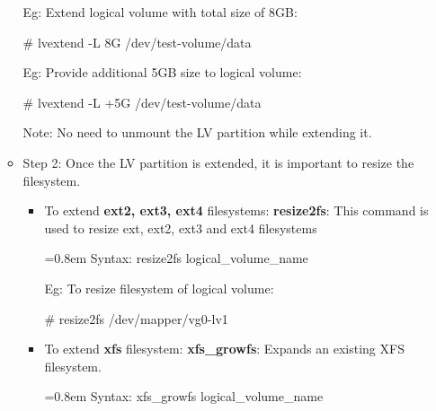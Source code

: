 \begin{flushleft}
\begin{itemize}
\begin{itemize}
			Eg: Extend logical volume with total size of 8GB:
		
			\begin{tcolorbox}[breakable,notitle,boxrule=-0pt,colback=black,colframe=black]
				\color{green}
				\font=9pt
				\# lvextend -L 8G /dev/test-volume/data
				\font=4pt
			\end{tcolorbox}
		
			Eg: Provide additional 5GB size to logical volume:
			\bigskip
			\begin{tcolorbox}[breakable,notitle,boxrule=-0pt,colback=black,colframe=black]
				\color{green}
				\font=9pt
				\# lvextend -L +5G /dev/test-volume/data
				\font=4pt
			\end{tcolorbox}
			
			\bigskip
			\begin{tcolorbox}[breakable,notitle,boxrule=-0pt,colback=yellow,colframe=yellow]
				\color{black}
				Note: No need to unmount the LV partition while extending it.
			\end{tcolorbox}
			
			
			\item Step 2:
			\newline
			Once the LV partition is extended, it is important to resize the filesystem.
			\begin{itemize}
				\item To extend \textbf{ext2, ext3, ext4} filesystems:
				\newline
				\textbf{resize2fs}: This command is used to resize ext, ext2, ext3 and ext4 filesystems
					\begin{tcolorbox}[breakable,notitle,boxrule=-0pt,colback=pink,colframe=pink]
						\color{black}
						\font=0.8em
						Syntax: resize2fs logical\_volume\_name
						\font=4pt
					\end{tcolorbox}
					
					Eg: To resize filesystem of logical volume:
					\begin{tcolorbox}[breakable,notitle,boxrule=-0pt,colback=black,colframe=black]
						\color{green}
						\fontdimen2\font=9pt
						\# resize2fs /dev/mapper/vg0-lv1
						\fontdimen2\font=4pt
					\end{tcolorbox}

			\item To extend \textbf{xfs} filesystem:
			\newline
			\textbf{xfs\_growfs}: Expands an existing XFS filesystem.
			\begin{tcolorbox}[breakable,notitle,boxrule=-0pt,colback=pink,colframe=pink]
				\color{black}
				\font=0.8em
				Syntax: xfs\_growfs logical\_volume\_name
				\fontdimen2\font=4pt
			\end{tcolorbox}
			

\end{itemize}
\end{itemize}
\end{itemize}
\end{flushleft}

